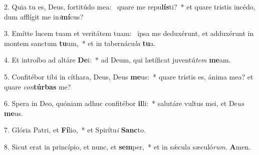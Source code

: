 2. Quia tu es, Deus, fortitúdo mea: \dag\  quare me repu\textbf{lís}ti?~*  et quare tristis incédo, dum afflígit me in\textit{i}\textbf{mí}cus?\

3. Emítte lucem tuam et veritátem tuam: \dag\  ipsa me deduxérunt, et adduxérunt in montem sanctum \textbf{tu}um,~*  et in tabernácu\textit{la} \textbf{tu}a.\

4. Et introíbo ad altáre \textbf{De}i:~*  ad Deum, qui lætíficat juventú\textit{tem} \textbf{me}am.\

5. Confitébor tibi in cíthara, Deus, Deus \textbf{me}us:~*  quare tristis es, ánima mea? et quare \textit{con}\textbf{túr}\textbf{bas} me?\

6. Spera in Deo, quóniam adhuc confitébor \textbf{il}li:~*  salutáre vultus mei, et De\textit{us} \textbf{me}us.\

7. Glória Patri, et \textbf{Fí}lio,~*  et Spirítu\textit{i} \textbf{Sanc}to.\

8. Sicut erat in princípio, et nunc, et \textbf{sem}per,~*  et in sǽcula sæculó\textit{rum}. \textbf{A}men.\

